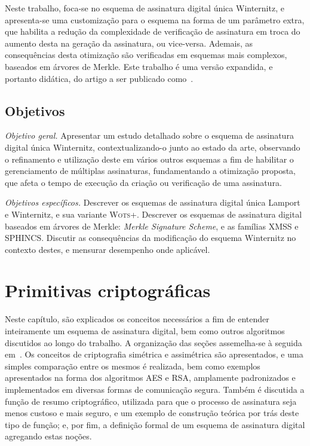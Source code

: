 \documentclass[12pt]{report}
\begin{document}
Neste trabalho, foca-se no esquema de assinatura digital única Winternitz, e
apresenta-se uma customização para o esquema na forma de um parâmetro extra,
que habilita a redução da complexidade de verificação de assinatura em troca
do aumento desta na geração da assinatura, ou vice-versa. Ademais, as
consequências desta otimização são verificadas em esquemas mais complexos,
baseados em árvores de Merkle. Este trabalho é uma versão expandida,
e portanto didática, do artigo a ser publicado como~\cite{Peri1806:Tuning}.

\section{Objetivos}

\emph{Objetivo geral.} Apresentar um estudo detalhado sobre o esquema de
assinatura digital única Winternitz, contextualizando-o junto ao estado da
arte, observando o refinamento e utilização deste em vários outros esquemas a
fim de habilitar o gerenciamento de múltiplas assinaturas, fundamentando a
otimização proposta, que afeta o tempo de execução da criação ou
verificação de uma assinatura.

\emph{Objetivos específicos.} Descrever os esquemas de assinatura digital única
Lamport e Winternitz, e sua variante \textsc{Wots+}. Descrever os esquemas de
assinatura digital baseados em árvores de Merkle: \emph{Merkle Signature
Scheme}, e as famílias XMSS e SPHINCS. Discutir as consequências da modificação
do esquema Winternitz no contexto destes, e mensurar desempenho onde aplicável.

\chapter{Primitivas criptográficas}

Neste capítulo, são explicados os conceitos necessários
a fim de entender inteiramente um esquema de assinatura digital, bem como outros
algoritmos discutidos ao longo do trabalho. A organização das seções assemelha-se
à seguida em~\cite{Gathen:2015:CRY:2857293}. Os conceitos de criptografia simétrica
e assimétrica são apresentados, e uma simples comparação entre os mesmos é realizada, 
bem como exemplos apresentados na forma dos algoritmos AES e RSA, amplamente
padronizados e implementados em diversas formas de comunicação segura. Também é
discutida a função de resumo criptográfico, utilizada para que o processo de assinatura
seja menos custoso e mais seguro, e um exemplo de construção teórica por trás
deste tipo de função; e, por fim, a definição formal de um esquema de assinatura
digital agregando estas noções.
\end{document}

